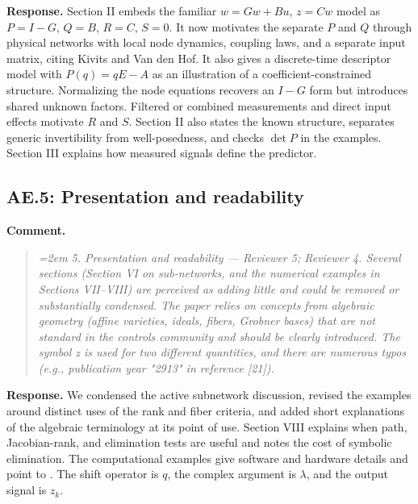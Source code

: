 \documentclass[11pt]{article}
\begin{document}
\textbf{Response.} Section II embeds the familiar $w=Gw+Bu$, $z=Cw$ model as $P=I-G$, $Q=B$, $R=C$, $S=0$. It now motivates the separate $P$ and $Q$ through physical networks with local node dynamics, coupling laws, and a separate input matrix, citing Kivits and Van den Hof. It also gives a discrete-time descriptor model with $P(q)=qE-A$ as an illustration of a coefficient-constrained structure. Normalizing the node equations recovers an $I-G$ form but introduces shared unknown factors. Filtered or combined measurements and direct input effects motivate $R$ and $S$. Section II also states the known structure, separates generic invertibility from well-posedness, and checks $\det P$ in the examples. Section III explains how measured signals define the predictor.

\subsection*{AE.5: Presentation and readability}
\textbf{Comment.}
\begin{quote}\itshape\emergencystretch=2em
5. Presentation and readability --- Reviewer 5; Reviewer 4. Several sections (Section VI on sub-networks, and the numerical examples in Sections VII--VIII) are perceived as adding little and could be removed or substantially condensed. The paper relies on concepts from algebraic geometry (affine varieties, ideals, fibers, Grobner bases) that are not standard in the controls community and should be clearly introduced. The symbol z is used for two different quantities, and there are numerous typos (e.g., publication year "2913" in reference [21]).
\end{quote}

\textbf{Response.} We condensed the active subnetwork discussion, revised the examples around distinct uses of the rank and fiber criteria, and added short explanations of the algebraic terminology at its point of use. Section VIII explains when path, Jacobian-rank, and elimination tests are useful and notes the cost of symbolic elimination. The computational examples give software and hardware details and point to . The shift operator is $q$, the complex argument is $\lambda$, and the output signal is $z_k$.
\end{document}
